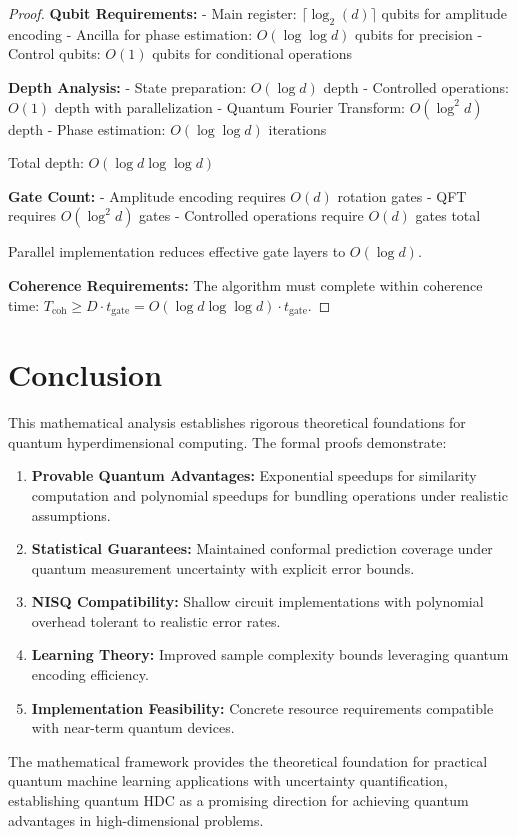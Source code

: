 \documentclass[11pt]{article}
\begin{document}
\begin{proof}
\textbf{Qubit Requirements:}
- Main register: $\lceil \log_2(d) \rceil$ qubits for amplitude encoding
- Ancilla for phase estimation: $O(\log \log d)$ qubits for precision
- Control qubits: $O(1)$ qubits for conditional operations

\textbf{Depth Analysis:}
- State preparation: $O(\log d)$ depth
- Controlled operations: $O(1)$ depth with parallelization
- Quantum Fourier Transform: $O(\log^2 d)$ depth
- Phase estimation: $O(\log \log d)$ iterations

Total depth: $O(\log d \log \log d)$

\textbf{Gate Count:}
- Amplitude encoding requires $O(d)$ rotation gates
- QFT requires $O(\log^2 d)$ gates
- Controlled operations require $O(d)$ gates total

Parallel implementation reduces effective gate layers to $O(\log d)$.

\textbf{Coherence Requirements:}
The algorithm must complete within coherence time: $T_{\text{coh}} \geq D \cdot t_{\text{gate}} = O(\log d \log \log d) \cdot t_{\text{gate}}$.
\end{proof}

\section{Conclusion}

This mathematical analysis establishes rigorous theoretical foundations for quantum hyperdimensional computing. The formal proofs demonstrate:

\begin{enumerate}
\item \textbf{Provable Quantum Advantages:} Exponential speedups for similarity computation and polynomial speedups for bundling operations under realistic assumptions.

\item \textbf{Statistical Guarantees:} Maintained conformal prediction coverage under quantum measurement uncertainty with explicit error bounds.

\item \textbf{NISQ Compatibility:} Shallow circuit implementations with polynomial overhead tolerant to realistic error rates.

\item \textbf{Learning Theory:} Improved sample complexity bounds leveraging quantum encoding efficiency.

\item \textbf{Implementation Feasibility:} Concrete resource requirements compatible with near-term quantum devices.
\end{enumerate}

The mathematical framework provides the theoretical foundation for practical quantum machine learning applications with uncertainty quantification, establishing quantum HDC as a promising direction for achieving quantum advantages in high-dimensional problems.



\end{document}
